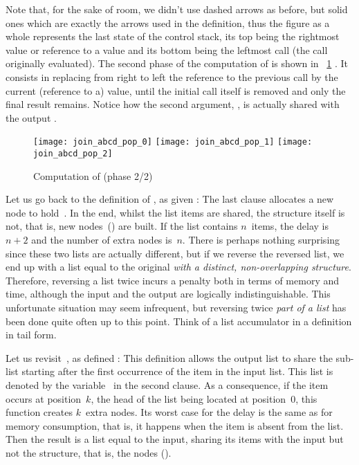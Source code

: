 Note that, for the sake of room, we didn't use dashed arrows as
before, but solid ones which are exactly the arrows used in the
definition, thus the figure as a whole represents the last state of
the control stack, its top being the rightmost value or reference to a
value and its bottom being the leftmost call (the call originally
evaluated). The second phase of the computation of
 is shown in \fig~\ref{fig:join_abcd_pop}
. It consists in replacing from right to
left the reference to the previous call by the current (reference to
a) value, until the initial call itself is removed and only the final
result remains. Notice how the second argument, \erlcode{[c,d]}, is
actually shared with the output \erlcode{[a,b,c,d]}.
\begin{figure}[!h]
\centering
\texttt{[image: join\_abcd\_pop\_0]}
\texttt{[image: join\_abcd\_pop\_1]}
\texttt{[image: join\_abcd\_pop\_2]}
\caption{Computation of  (phase 2/2)
\label{fig:join_abcd_pop}}
\end{figure}

Let us go back to the definition of , as given
:  The last clause
allocates a new node to hold~. In the end, whilst the list
items are shared, the structure itself is not, that is, new
nodes~(\erlcode{|}) are built. If the list contains \(n\)~items, the
delay is~\(n+2\) and the number of extra nodes is~\(n\). There is
perhaps nothing surprising since these two lists are actually
different, but if we reverse the reversed list, we end up with a list
equal to the original \emph{with a distinct, non\hyp{}overlapping
  structure}. Therefore, reversing a list twice incurs a penalty both
in terms of memory and time, although the input and the output are
logically indistinguishable. This unfortunate situation may seem
infrequent, but reversing twice \emph{part of a list} has been done
quite often up to this point. Think of a list accumulator in a
definition in tail form.

Let us revisit~, as defined
:
 This definition allows the output list to
share the sub\hyp{}list starting after the first occurrence of the
item in the input list. This list is denoted by the
variable~ in the second clause. As a consequence, if the
item occurs at position~\(k\), the head of the list being located at
position~\(0\), this function creates \(k\)~extra nodes. Its worst
case for the delay is the same as for memory consumption, that is, it
happens when the item is absent from the list. Then the result is a
list equal to the input, sharing its items with the input but not the
structure, that is, the nodes (\erlcode{|}).

